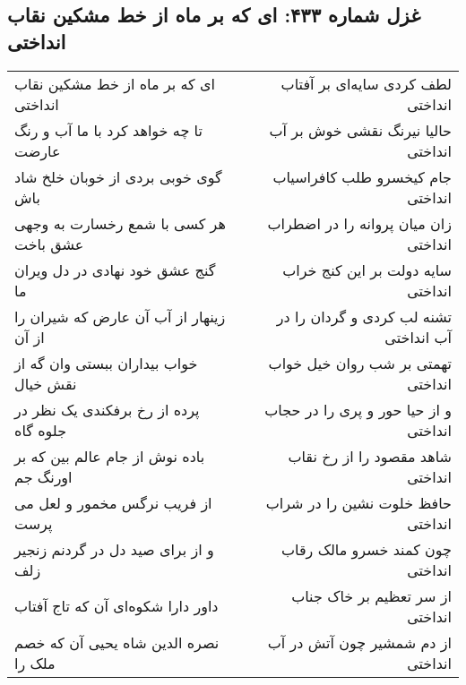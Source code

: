 \begin{center}
\section*{غزل شماره ۴۳۳: ای که بر ماه از خط مشکین نقاب انداختی}
\label{sec:sh433}
\begin{longtable}{l p{0.5cm} r}
ای که بر ماه از خط مشکین نقاب انداختی
&&
لطف کردی سایه‌ای بر آفتاب انداختی
\\
تا چه خواهد کرد با ما آب و رنگ عارضت
&&
حالیا نیرنگ نقشی خوش بر آب انداختی
\\
گوی خوبی بردی از خوبان خلخ شاد باش
&&
جام کیخسرو طلب کافراسیاب انداختی
\\
هر کسی با شمع رخسارت به وجهی عشق باخت
&&
زان میان پروانه را در اضطراب انداختی
\\
گنج عشق خود نهادی در دل ویران ما
&&
سایه دولت بر این کنج خراب انداختی
\\
زینهار از آب آن عارض که شیران را از آن
&&
تشنه لب کردی و گردان را در آب انداختی
\\
خواب بیداران ببستی وان گه از نقش خیال
&&
تهمتی بر شب روان خیل خواب انداختی
\\
پرده از رخ برفکندی یک نظر در جلوه گاه
&&
و از حیا حور و پری را در حجاب انداختی
\\
باده نوش از جام عالم بین که بر اورنگ جم
&&
شاهد مقصود را از رخ نقاب انداختی
\\
از فریب نرگس مخمور و لعل می پرست
&&
حافظ خلوت نشین را در شراب انداختی
\\
و از برای صید دل در گردنم زنجیر زلف
&&
چون کمند خسرو مالک رقاب انداختی
\\
داور دارا شکوه‌ای آن که تاج آفتاب
&&
از سر تعظیم بر خاک جناب انداختی
\\
نصره الدین شاه یحیی آن که خصم ملک را
&&
از دم شمشیر چون آتش در آب انداختی
\\
\end{longtable}
\end{center}
